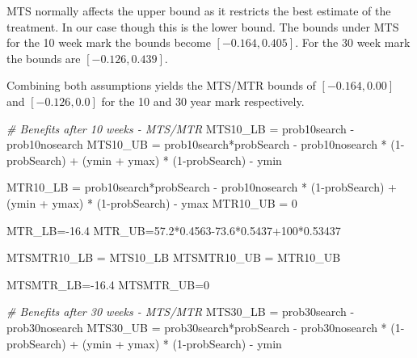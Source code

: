 \documentclass[
]{article}
\newenvironment{Shaded}{\begin{snugshade}}{\end{snugshade}}
\newcommand{\CommentTok}[1]{\textcolor[rgb]{0.56,0.35,0.01}{\textit{#1}}}
\newcommand{\DecValTok}[1]{\textcolor[rgb]{0.00,0.00,0.81}{#1}}
\newcommand{\FloatTok}[1]{\textcolor[rgb]{0.00,0.00,0.81}{#1}}
\newcommand{\NormalTok}[1]{#1}
\newcommand{\OtherTok}[1]{\textcolor[rgb]{0.56,0.35,0.01}{#1}}
\newcommand{\SpecialCharTok}[1]{\textcolor[rgb]{0.00,0.00,0.00}{#1}}
\begin{document}
MTS normally affects the upper bound as it restricts the best estimate
of the treatment. In our case though this is the lower bound. The bounds
under MTS for the 10 week mark the bounds become \([-0.164, 0.405]\).
For the 30 week mark the bounds are \([-0.126, 0.439]\).

Combining both assumptions yields the MTS/MTR bounds of
\([-0.164, 0.00]\) and \([-0.126, 0.0]\) for the 10 and 30 year mark
respectively.

\begin{Shaded}
\begin{Highlighting}[]
\CommentTok{\# Benefits after 10 weeks {-} MTS/MTR}
\NormalTok{MTS10\_LB }\OtherTok{=}\NormalTok{ prob10search }\SpecialCharTok{{-}}\NormalTok{ prob10nosearch}
\NormalTok{MTS10\_UB }\OtherTok{=}\NormalTok{ prob10search}\SpecialCharTok{*}\NormalTok{probSearch }\SpecialCharTok{{-}}\NormalTok{ prob10nosearch }\SpecialCharTok{*}\NormalTok{ (}\DecValTok{1}\SpecialCharTok{{-}}\NormalTok{probSearch) }\SpecialCharTok{+}\NormalTok{ (ymin }\SpecialCharTok{+}\NormalTok{ ymax) }\SpecialCharTok{*}\NormalTok{ (}\DecValTok{1}\SpecialCharTok{{-}}\NormalTok{probSearch) }\SpecialCharTok{{-}}\NormalTok{ ymin}

\NormalTok{MTR10\_LB }\OtherTok{=}\NormalTok{ prob10search}\SpecialCharTok{*}\NormalTok{probSearch }\SpecialCharTok{{-}}\NormalTok{ prob10nosearch }\SpecialCharTok{*}\NormalTok{ (}\DecValTok{1}\SpecialCharTok{{-}}\NormalTok{probSearch) }\SpecialCharTok{+}\NormalTok{ (ymin }\SpecialCharTok{+}\NormalTok{ ymax) }\SpecialCharTok{*}\NormalTok{ (}\DecValTok{1}\SpecialCharTok{{-}}\NormalTok{probSearch) }\SpecialCharTok{{-}}\NormalTok{ ymax}
\NormalTok{MTR10\_UB }\OtherTok{=} \DecValTok{0}

\NormalTok{MTR\_LB}\OtherTok{=}\SpecialCharTok{{-}}\FloatTok{16.4}
\NormalTok{MTR\_UB}\OtherTok{=}\FloatTok{57.2}\SpecialCharTok{*}\FloatTok{0.4563{-}73.6}\SpecialCharTok{*}\FloatTok{0.5437}\SpecialCharTok{+}\DecValTok{100}\SpecialCharTok{*}\FloatTok{0.53437}

\NormalTok{MTSMTR10\_LB }\OtherTok{=}\NormalTok{ MTS10\_LB}
\NormalTok{MTSMTR10\_UB }\OtherTok{=}\NormalTok{ MTR10\_UB}

\NormalTok{MTSMTR\_LB}\OtherTok{=}\SpecialCharTok{{-}}\FloatTok{16.4}
\NormalTok{MTSMTR\_UB}\OtherTok{=}\DecValTok{0}

\CommentTok{\# Benefits after 30 weeks {-} MTS/MTR}
\NormalTok{MTS30\_LB }\OtherTok{=}\NormalTok{ prob30search }\SpecialCharTok{{-}}\NormalTok{ prob30nosearch}
\NormalTok{MTS30\_UB }\OtherTok{=}\NormalTok{ prob30search}\SpecialCharTok{*}\NormalTok{probSearch }\SpecialCharTok{{-}}\NormalTok{ prob30nosearch }\SpecialCharTok{*}\NormalTok{ (}\DecValTok{1}\SpecialCharTok{{-}}\NormalTok{probSearch) }\SpecialCharTok{+}\NormalTok{ (ymin }\SpecialCharTok{+}\NormalTok{ ymax) }\SpecialCharTok{*}\NormalTok{ (}\DecValTok{1}\SpecialCharTok{{-}}\NormalTok{probSearch) }\SpecialCharTok{{-}}\NormalTok{ ymin}
  

\end{Highlighting}
\end{Shaded}
\end{document}
